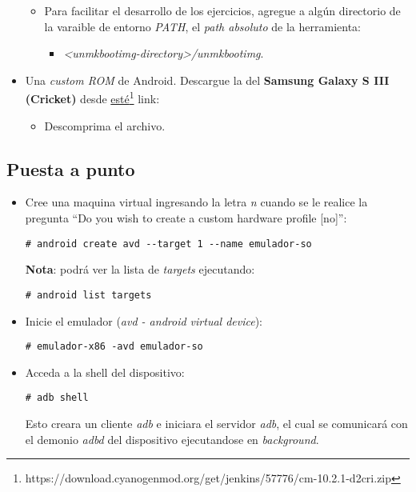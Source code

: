 \begin{itemize}
\begin{itemize}
      \item Para facilitar el desarrollo de los ejercicios, agregue a algún directorio de la varaible de entorno \textit{PATH}, el \textit{path absoluto} de la herramienta:
      \begin{itemize}
  \item \textit{<unmkbootimg-directory>/unmkbootimg}.
      \end{itemize}
 \end{itemize}
 
 \item Una \textit{custom ROM} de Android. Descargue la del \textbf{Samsung Galaxy S III (Cricket)} desde \href{https://download.cyanogenmod.org/get/jenkins/57776/cm-10.2.1-d2cri.zip}{esté}\footnote{https://download.cyanogenmod.org/get/jenkins/57776/cm-10.2.1-d2cri.zip} link:
 \begin{itemize}
      \item Descomprima el archivo.
 \end{itemize} 
\end{itemize}


\subsection{Puesta a punto}
\begin{itemize}
    \item Cree una maquina virtual ingresando la letra \textit{n} cuando se le realice la pregunta ``Do you wish to create a custom hardware profile [no]'':
    \begin{lstlisting}
# android create avd --target 1 --name emulador-so
    \end{lstlisting}
    \textbf{Nota}: podrá ver la lista de \textit{targets} ejecutando:
    \begin{lstlisting}
# android list targets
    \end{lstlisting}
    
    \item Inicie el emulador (\textit{avd - android virtual device}):
    \begin{lstlisting}
# emulador-x86 -avd emulador-so
    \end{lstlisting}

    \item Acceda a la shell del dispositivo:
    \begin{lstlisting}
# adb shell
    \end{lstlisting}
    Esto creara un cliente \textit{adb} e iniciara el servidor \textit{adb}, el cual se comunicará con el demonio \textit{adbd} del dispositivo ejecutandose en \textit{background}.
\end{itemize}

